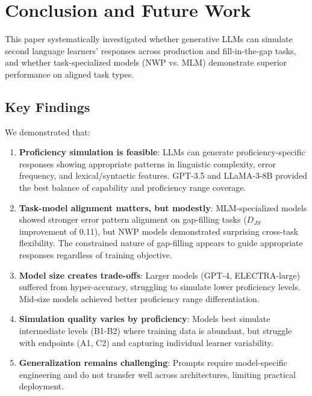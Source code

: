 \section{Conclusion and Future Work}

This paper systematically investigated whether generative LLMs can simulate second language learners' responses across production and fill-in-the-gap tasks, and whether task-specialized models (NWP vs. MLM) demonstrate superior performance on aligned task types.

\subsection{Key Findings}

We demonstrated that:

\begin{enumerate}
    \item \textbf{Proficiency simulation is feasible}: LLMs can generate proficiency-specific responses showing appropriate patterns in linguistic complexity, error frequency, and lexical/syntactic features. GPT-3.5 and LLaMA-3-8B provided the best balance of capability and proficiency range coverage.

    \item \textbf{Task-model alignment matters, but modestly}: MLM-specialized models showed stronger error pattern alignment on gap-filling tasks ($D_{JS}$ improvement of 0.11), but NWP models demonstrated surprising cross-task flexibility. The constrained nature of gap-filling appears to guide appropriate responses regardless of training objective.

    \item \textbf{Model size creates trade-offs}: Larger models (GPT-4, ELECTRA-large) suffered from hyper-accuracy, struggling to simulate lower proficiency levels. Mid-size models achieved better proficiency range differentiation.

    \item \textbf{Simulation quality varies by proficiency}: Models best simulate intermediate levels (B1-B2) where training data is abundant, but struggle with endpoints (A1, C2) and capturing individual learner variability.

    \item \textbf{Generalization remains challenging}: Prompts require model-specific engineering and do not transfer well across architectures, limiting practical deployment.
\end{enumerate}

